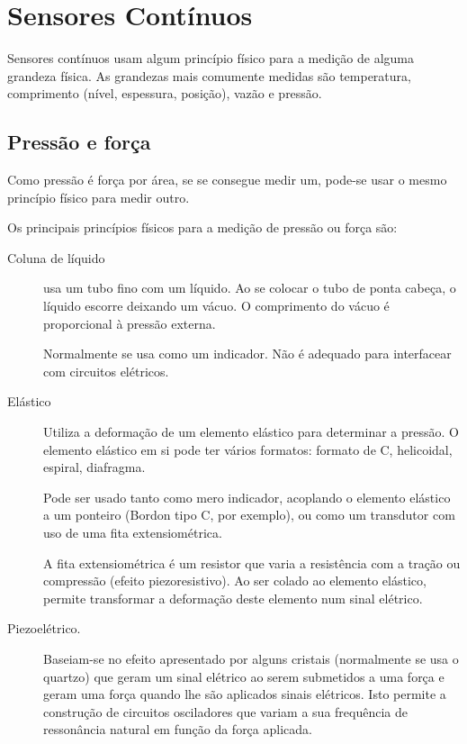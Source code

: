 \section{Sensores Contínuos}

Sensores contínuos usam algum princípio físico para a medição de alguma grandeza física. As grandezas mais comumente medidas são temperatura, comprimento (nível, espessura, posição), vazão e pressão.

\subsection{Pressão e força}
\label{sub:Pressão e força}
Como pressão é força por área, se se consegue medir um, pode-se usar o mesmo princípio físico para medir outro.

Os principais princípios físicos para a medição de pressão ou força são:
\begin{description}
  \item[Coluna de líquido] usa um tubo fino com um líquido. Ao se colocar o tubo de ponta cabeça, o líquido escorre deixando um vácuo. O comprimento do vácuo é proporcional à pressão externa.

  Normalmente se usa como um indicador. Não é adequado para interfacear com circuitos elétricos.

  \item[Elástico] Utiliza a deformação de um elemento elástico para determinar a pressão. O elemento elástico em si pode ter vários formatos: formato de C, helicoidal, espiral, diafragma.

  Pode ser usado tanto como mero indicador, acoplando o elemento elástico a um ponteiro (Bordon tipo C, por exemplo), ou como um transdutor com uso de uma fita extensiométrica.

  A fita extensiométrica é um resistor que varia a resistência com a tração ou compressão (efeito piezoresistivo). Ao ser colado ao elemento elástico, permite transformar a deformação deste elemento num sinal elétrico.

  \item[Piezoelétrico.] Baseiam-se no efeito apresentado por alguns cristais (normalmente se usa o quartzo) que geram um sinal elétrico ao serem submetidos a uma força e geram uma força quando lhe são aplicados sinais elétricos. Isto permite a construção de circuitos osciladores que variam a sua frequência de ressonância natural em função da força aplicada.
\end{description}

